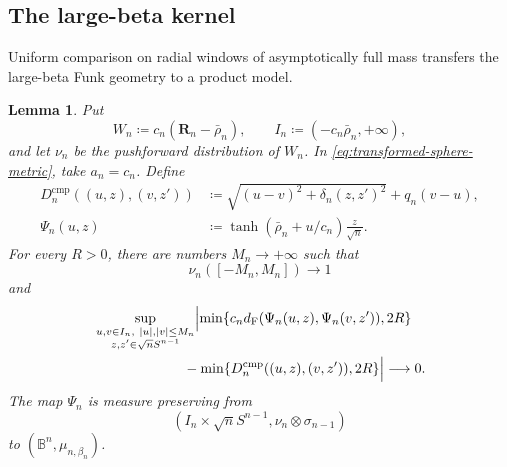 \documentclass[10pt,a4paper]{amsart}
\numberwithin{equation}{section}
\newtheorem{lemma}[theorem]{Lemma}
\newcommand{\B}{\mathbb B}
\newcommand{\dF}{d_{\mathrm F}}
\begin{document}
\subsection{The large-beta kernel}

Uniform comparison on radial windows of asymptotically full mass transfers the large-beta Funk geometry to a product model.

\begin{lemma}\label{lem:large-beta-kernel-comparison}
Put
\[ W_n\coloneqq c_n(\mathbf R_n-\bar\rho_n), \qquad I_n\coloneqq(-c_n\bar\rho_n,+\infty), \]
and let $\nu_n$ be the pushforward distribution of $W_n$.  In \eqref{eq:transformed-sphere-metric}, take $a_n=c_n$.  Define
\begin{align}
 D_n^{\mathrm{cmp}}((u,z),(v,z'))
 &\coloneqq\sqrt{(u-v)^2+\delta_n(z,z')^2}+q_n(v-u),
 \label{eq:large-beta-comparison-kernel}\\
\Psi_n(u,z) &\coloneqq\tanh(\bar\rho_n+u/c_n)\frac z{\sqrt n}. \label{eq:large-beta-comparison-map}
\end{align}
For every $R>0$, there are numbers $M_n\to+\infty$ such that
\begin{equation}\label{eq:large-beta-window-mass} \nu_n([-M_n,M_n])\longrightarrow1 \end{equation}
and
\begin{equation}\label{eq:large-beta-truncated-kernel}
 \begin{multlined}
 \sup_{\substack{u,v\in I_n,\ |u|,|v|\le M_n\\
 z,z'\in\sqrt nS^{n-1}}}
 \Bigl|\min\{c_n\dF(\Psi_n(u,z),\Psi_n(v,z')),2R\}\\
 {}-\min\{D_n^{\mathrm{cmp}}((u,z),(v,z')),2R\}\Bigr|
 \longrightarrow0.
 \end{multlined}
\end{equation}
The map $\Psi_n$ is measure preserving from
\[ (I_n\times\sqrt nS^{n-1},\nu_n\otimes\sigma_{n-1}) \]
to $(\B^n,\mu_{n,\beta_n})$.
\end{lemma}
\end{document}
